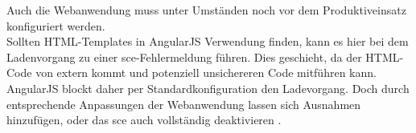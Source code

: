 \label{sec:anpassen-der-webanwendung}
Auch die Webanwendung muss unter Umständen noch vor dem Produktiveinsatz konfiguriert werden. \\
Sollten HTML-Templates in AngularJS Verwendung finden, kann es hier bei dem Ladenvorgang zu einer \ac{sce}-Fehlermeldung führen. Dies geschieht, da der HTML-Code von extern kommt und potenziell unsichereren Code mitführen kann. AngularJS blockt daher per Standardkonfiguration den Ladevorgang. Doch durch entsprechende Anpassungen der Webanwendung lassen sich Ausnahmen hinzufügen, oder das \ac{sce} auch vollständig deaktivieren \cite{Google2016d}.
